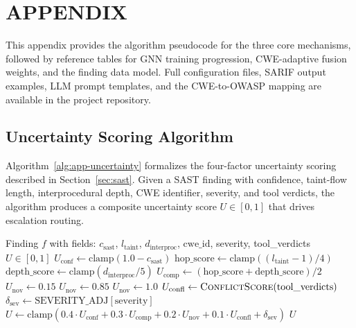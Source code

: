 \chapter{\uppercase{Appendix}}

This appendix provides the algorithm pseudocode for the three core mechanisms, followed by reference tables for GNN training progression, CWE-adaptive fusion weights, and the finding data model. Full configuration files, SARIF output examples, LLM prompt templates, and the CWE-to-OWASP mapping are available in the project repository.

\section{Uncertainty Scoring Algorithm}
\label{app:uncertainty-alg}

Algorithm~\ref{alg:app-uncertainty} formalizes the four-factor uncertainty scoring described in Section~\ref{sec:sast}. Given a SAST finding with confidence, taint-flow length, interprocedural depth, CWE identifier, severity, and tool verdicts, the algorithm produces a composite uncertainty score $U \in [0, 1]$ that drives escalation routing.

\begin{algorithm}[H]
\caption{Four-Factor Uncertainty Scoring}
\label{alg:app-uncertainty}
\begin{algorithmic}[1]
\Require Finding $f$ with fields: $c_{\text{sast}}$, $l_{\text{taint}}$, $d_{\text{interproc}}$, $\text{cwe\_id}$, severity, tool\_verdicts
\Ensure $U \in [0, 1]$
\State $U_{\text{conf}} \gets \text{clamp}(1.0 - c_{\text{sast}})$
\State $\text{hop\_score} \gets \text{clamp}((l_{\text{taint}} - 1) / 4)$
\State $\text{depth\_score} \gets \text{clamp}(d_{\text{interproc}} / 5)$
\State $U_{\text{comp}} \gets (\text{hop\_score} + \text{depth\_score}) / 2$
    \State $U_{\text{nov}} \gets 0.15$
    \State $U_{\text{nov}} \gets 0.85$
\Else
    \State $U_{\text{nov}} \gets 1.0$
\EndIf
\State $U_{\text{confl}} \gets \Call{ConflictScore}{\text{tool\_verdicts}}$ 
\State $\delta_{\text{sev}} \gets \text{SEVERITY\_ADJ}[\text{severity}]$ 
\State $U \gets \text{clamp}(0.4 \cdot U_{\text{conf}} + 0.3 \cdot U_{\text{comp}} + 0.2 \cdot U_{\text{nov}} + 0.1 \cdot U_{\text{confl}} + \delta_{\text{sev}})$
\State \Return $U$
\end{algorithmic}
\end{algorithm}

